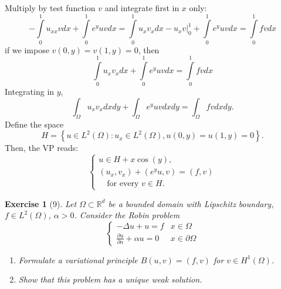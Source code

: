 \documentclass[letterpaper,twoside,11pt]{article}
\theoremstyle{mystyle}
\newtheorem*{exercise}{Exercise}
\newcommand{\R}{{\mathbb R}}
\begin{document}
Multiply by test function $v$ and integrate first in $x$ only: 
\[-\int\limits_0^1 u_{xx} v dx + \int\limits_0^1 e^y u v dx =\int\limits_0^1 u_{x} v_x  dx - u_xv|_0^1  + \int\limits_0^1 e^y u v dx= \int\limits_0^1 f vdx\]
if we impose $v(0, y) = v(1, y) = 0$, then 
\[\int\limits_0^1 u_{x} v_x  dx + \int\limits_0^1 e^y u v dx = \int\limits_0^1 fv dx\]
Integrating in $y$, 
\[\int_\Omega u_xv_x dx dy + \int_\Omega e^y u v dx dy= \int_\Omega f vdx dy. \]
Define the space 
\[H = \left\{ u \in L^2 (\Omega) : u_x \in L^2 (\Omega), u\left( 0, y \right) = u\left( 1, y \right) = 0\right\}.\] 
Then, the VP reads: 
\[\left\{ {\begin{array}{*{20}{l}}
  {u \in H+x\cos(y),} \\[.2cm] 
  \left( u_x, v_x \right) + \left( e^y u, v \right) = \left( f, v \right) \\[.2cm]
  \quad \text{for every } v\in H.
\end{array}} \right.\]



\begin{exercise}[9]
Let $\Omega\subset \R^d$ be a bounded domain with Lipschitz boundary, $f \in L^2 \left( \Omega \right)$, $\alpha > 0$. Consider the Robin problem
\[\left\{ {\begin{array}{*{20}{c}}
  { -\Delta u + u = f}&{x\in \Omega} \\[.2cm] 
  {\displaystyle \frac{\partial u}{\partial n }+ \alpha u = 0}&{x \in \partial \Omega} 
\end{array}} \right.\]
\begin{enumerate}
  \item Formulate a variational principle $B(u,v) = (f, v)$ for $v \in H^1 \left( \Omega \right)$. 
  \item Show that this problem has a unique weak solution. 
\end{enumerate}
\end{exercise}
\end{document}
